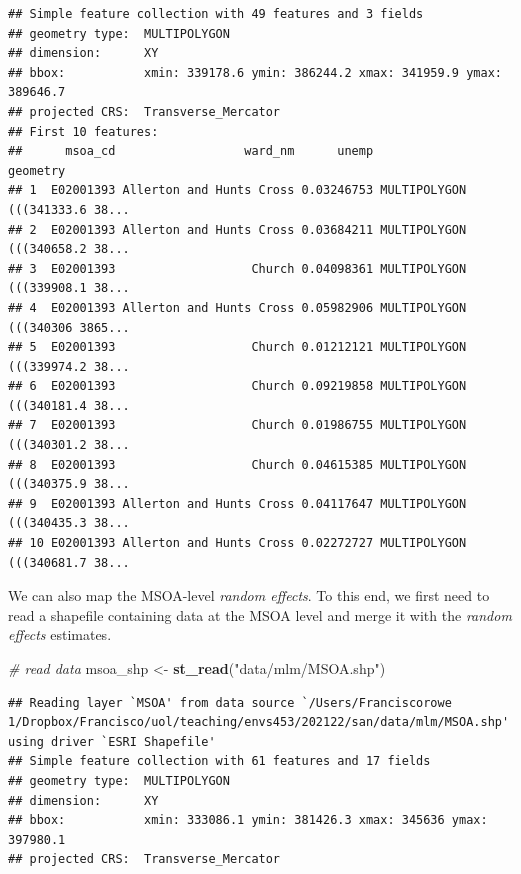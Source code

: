 \documentclass[
]{book}
\newenvironment{Shaded}{\begin{snugshade}}{\end{snugshade}}
\newcommand{\CommentTok}[1]{\textcolor[rgb]{0.56,0.35,0.01}{\textit{#1}}}
\newcommand{\KeywordTok}[1]{\textcolor[rgb]{0.13,0.29,0.53}{\textbf{#1}}}
\newcommand{\NormalTok}[1]{#1}
\newcommand{\OperatorTok}[1]{\textcolor[rgb]{0.81,0.36,0.00}{\textbf{#1}}}
\newcommand{\StringTok}[1]{\textcolor[rgb]{0.31,0.60,0.02}{#1}}
\begin{document}
\begin{verbatim}
## Simple feature collection with 49 features and 3 fields
## geometry type:  MULTIPOLYGON
## dimension:      XY
## bbox:           xmin: 339178.6 ymin: 386244.2 xmax: 341959.9 ymax: 389646.7
## projected CRS:  Transverse_Mercator
## First 10 features:
##      msoa_cd                  ward_nm      unemp                       geometry
## 1  E02001393 Allerton and Hunts Cross 0.03246753 MULTIPOLYGON (((341333.6 38...
## 2  E02001393 Allerton and Hunts Cross 0.03684211 MULTIPOLYGON (((340658.2 38...
## 3  E02001393                   Church 0.04098361 MULTIPOLYGON (((339908.1 38...
## 4  E02001393 Allerton and Hunts Cross 0.05982906 MULTIPOLYGON (((340306 3865...
## 5  E02001393                   Church 0.01212121 MULTIPOLYGON (((339974.2 38...
## 6  E02001393                   Church 0.09219858 MULTIPOLYGON (((340181.4 38...
## 7  E02001393                   Church 0.01986755 MULTIPOLYGON (((340301.2 38...
## 8  E02001393                   Church 0.04615385 MULTIPOLYGON (((340375.9 38...
## 9  E02001393 Allerton and Hunts Cross 0.04117647 MULTIPOLYGON (((340435.3 38...
## 10 E02001393 Allerton and Hunts Cross 0.02272727 MULTIPOLYGON (((340681.7 38...
\end{verbatim}

We can also map the MSOA-level \emph{random effects}. To this end, we first need to read a shapefile containing data at the MSOA level and merge it with the \emph{random effects} estimates.

\begin{Shaded}
\begin{Highlighting}[]
\CommentTok{# read data}
\NormalTok{msoa_shp <-}\StringTok{ }\KeywordTok{st_read}\NormalTok{(}\StringTok{"data/mlm/MSOA.shp"}\NormalTok{)}
\end{Highlighting}
\end{Shaded}

\begin{verbatim}
## Reading layer `MSOA' from data source `/Users/Franciscorowe 1/Dropbox/Francisco/uol/teaching/envs453/202122/san/data/mlm/MSOA.shp' using driver `ESRI Shapefile'
## Simple feature collection with 61 features and 17 fields
## geometry type:  MULTIPOLYGON
## dimension:      XY
## bbox:           xmin: 333086.1 ymin: 381426.3 xmax: 345636 ymax: 397980.1
## projected CRS:  Transverse_Mercator
\end{verbatim}

\begin{Shaded}
\end{Shaded}
\end{document}
